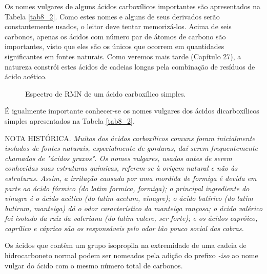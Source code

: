 Os nomes vulgares de alguns ácidos carboxílicos importantes são apresentados na Tabela \ref{tab8_2}. Como estes nomes e alguns de seus derivados serão constantemente usados, o leitor deve tentar memorizá-los. Acima de seis carbonos, apenas os ácidos com número par de átomos de carbono são importantes, visto que eles são os únicos que ocorrem em quantidades significantes em fontes naturais. Como veremos mais tarde (Capítulo 27), a natureza constrói estes ácidos de cadeias longas pela combinação de resíduos de ácido acético. 

\begin{figure}[H]
    \centering
    \caption{Espectro de RMN de um ácido carboxílico simples.}
    \label{fig8_5}
\end{figure}

É igualmente importante conhecer-se os nomes vulgares dos ácidos dicarboxílicos simples apresentados na Tabela \ref{tab8_2}. 

\par\bigskip
\noindent NOTA HISTÓRICA. \emph{Muitos dos ácidos carboxílicos comuns foram inicialmente isolados de fontes naturais, especialmente de gorduras, daí serem frequentemente chamados de "ácidos graxos". Os nomes vulgares, usados antes de serem conhecidas suas estruturas químicas, referem-se à origem natural e não às estruturas. Assim, a irritação causada por uma mordida de formiga é devida em parte ao ácido fórmico (do latim formica, formiga); o principal ingrediente do vinagre é o ácido acético (do latim acetum, vinagre); o ácido butírico (do latim butirum, manteiga) dá o odor característico da manteiga rançosa; o ácido valérico foi isolado da raiz da valeriana (do latim valere, ser forte); e os ácidos capróico, caprílico e cáprico são os responsáveis pelo odor tão pouco social das cabras.}
\par\bigskip

Os ácidos que contêm um grupo isopropila na extremidade de uma cadeia de hidrocarboneto normal podem ser nomeados pela adição do prefixo \textit{-iso} ao nome vulgar do ácido com o mesmo número total de carbonos.

\begin{tightcenter}
\chemnameinit{}
    \qquad
\end{tightcenter}

